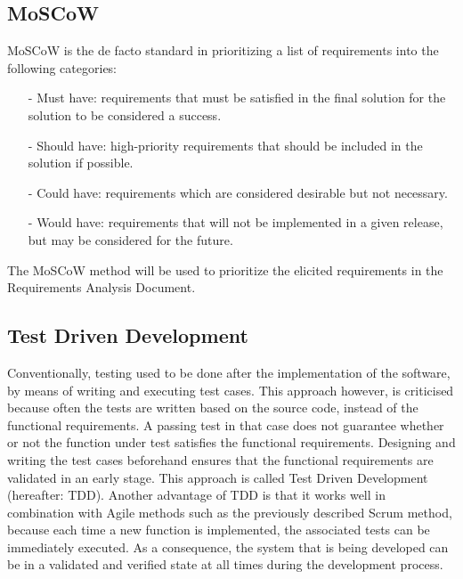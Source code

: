 \subsection{MoSCoW}
MoSCoW is the de facto standard in prioritizing a list of requirements into the following categories:
\begin{itemize}
\item[-] Must have: requirements that must be satisfied in the final solution for the solution to be considered a success.
\item[-] Should have: high-priority requirements that should be included in the solution if possible.
\item[-] Could have: requirements which are considered desirable but not necessary.
\item[-] Would have: requirements that will not be implemented in a given release, but may be considered for the future.
\end{itemize}
The MoSCoW method will be used to prioritize the elicited requirements in the Requirements Analysis Document.
\subsection{Test Driven Development}
\label{sec:tdd}
Conventionally, testing used to be done after the implementation of the software, by means of writing and executing test cases. This approach however, is criticised because often the tests are written based on the source code, instead of the functional requirements. A passing test in that case does not guarantee whether or not the function under test satisfies the functional requirements. Designing and writing the test cases beforehand ensures that the functional requirements are validated in an early stage. This approach is called Test Driven Development (hereafter: TDD). Another advantage of TDD is that it works well in combination with Agile methods such as the previously described Scrum method, because each time a new function is implemented, the associated tests can be immediately executed. As a consequence, the system that is being developed can be in a validated and verified state at all times during the development process.

